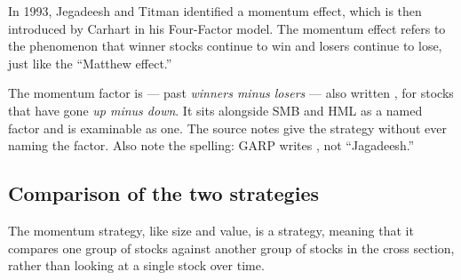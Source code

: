 In 1993, Jegadeesh and Titman identified a momentum effect, which is then
introduced by Carhart in his Four-Factor model. The momentum effect refers to the
phenomenon that winner stocks continue to win and losers continue to lose, just
like the ``Matthew effect.''

\begin{imtrapbox}[title={The factor has a name, and the notes omit it}]
The momentum factor is  --- past \emph{winners minus losers} --- also
written , for stocks that have gone \emph{up minus down}. It sits
alongside SMB and HML as a named factor and is examinable as one. The source
notes give the strategy without ever naming the factor. Also note the spelling:
GARP writes , not ``Jagadeesh.''
\end{imtrapbox}

\subsection{Comparison of the two strategies}

\begin{imdefbox}[title={The same}]
The momentum strategy, like size and value, is a  strategy,
meaning that it compares one group of stocks against another group of stocks in
the cross section, rather than looking at a single stock over time.
\end{imdefbox}

